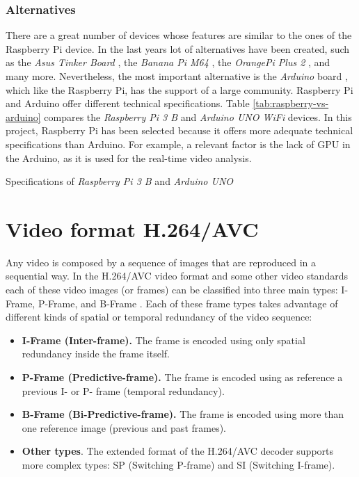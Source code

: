 \subsubsection{Alternatives}
There are a great number of devices whose features are similar to the ones of the Raspberry Pi device. In the last years lot of alternatives have been created, such as the \textit{Asus Tinker Board} \cite{Tinker}, the \textit{Banana Pi M64} \cite{M64}, the \textit{OrangePi Plus 2} \cite{OrangePi}, and many more. Nevertheless, the most important alternative is the \textit{Arduino} board \cite{Arduino}, which like the Raspberry Pi, has the support of a large community. Raspberry Pi and Arduino offer different technical specifications. Table \ref{tab:raspberry-vs-arduino} compares the \textit{Raspberry Pi 3 B} and \textit{Arduino UNO WiFi} devices. In this project, Raspberry Pi has been selected because it offers more adequate technical specifications than Arduino. For example, a relevant factor is the lack of \ac{GPU} in the Arduino, as it is used for the real-time video analysis.

\begin{table}[!h]
	\centering
	{\small
		
	}
	\caption{Specifications of \textit{Raspberry Pi 3 B} and \textit{Arduino UNO}}
	\label{tab:raspberry-vs-arduino}
\end{table}


\section{Video format H.264/AVC}
\label{subsect:H.264}
Any video is composed by a sequence of images that are reproduced in a sequential way. In the H.264/AVC video format and some other video standards each of these video images (or frames) can be classified into three main types: I-Frame, P-Frame, and B-Frame \cite{SC11}. Each of these frame types takes advantage of different kinds of spatial or temporal redundancy of the video sequence: 
\begin{itemize}
	\item \textbf{I-Frame (Inter-frame).} The frame is encoded using only spatial redundancy inside the frame itself.
	\item \textbf{P-Frame (Predictive-frame).} The frame is encoded using as reference a previous I- or P- frame (temporal redundancy).
	\item \textbf{B-Frame (Bi-Predictive-frame).} The frame is encoded using more than one reference image (previous and past frames).
	\item \textbf{Other types}. The extended format of the H.264/AVC decoder supports more complex types: SP (Switching P-frame) and SI (Switching I-frame).
\end{itemize}

